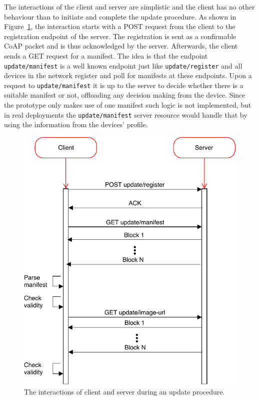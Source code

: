 \documentclass[0-thesis.tex]{subfiles}
\begin{document}
The interactions of the client and server are simplistic and the client has no other
behaviour than to initiate and complete the update procedure. As shown in
Figure~\ref{fig:client-server-interaction}, the interaction starts with a POST request
from the client to the registration endpoint of the server. The registration is sent as a
confirmable CoAP packet and is thus acknowledged by the server. Afterwards, the client
sends a GET request for a manifest. The idea is that the endpoint \texttt{update/manifest}
is a well known endpoint just like \texttt{update/register} and all devices in the network
register and poll for manifests at these endpoints. Upon a request to
\texttt{update/manifest} it is up to the server to decide whether there is a suitable
manifest or not, offloading any decision making from the device. Since the prototype only
makes use of one manifest such logic is not implemented, but in real deployments the
\texttt{update/manifest} server resource would handle that by using the information from
the devices' profile.

\begin{figure}
    \caption{The interactions of client and server during an update procedure.}
    \label{fig:client-server-interaction}
    \includegraphics{images/client-server-sequence.pdf}
\end{figure}
\end{document}
